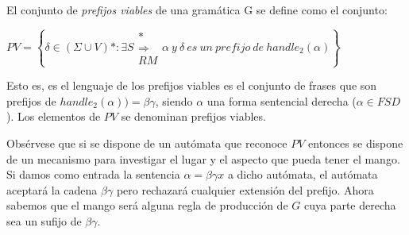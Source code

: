 \begin{definition}
El conjunto de \emph{prefijos viables} de una gramática G se define
como  el conjunto:

\begin{center}
$PV = \left \{ \delta \in (\Sigma \cup V)* :  \exists S \begin{array}{c} *\\ \Longrightarrow \\ {\scriptstyle RM} \end{array} \alpha\  y\ \delta\ es\ un\ prefijo\ de\  handle_2(\alpha) \right \}$ 
\end{center}
\end{definition}

Esto es, es el lenguaje de los prefijos viables es el 
conjunto de frases que son prefijos de 
$handle_2(\alpha)) =  \beta \gamma$, 
siendo $\alpha$ una forma sentencial derecha ($\alpha \in FSD$). Los
elementos de $PV$ se denominan prefijos viables.

Obsérvese que si se dispone de un autómata que reconoce 
$PV$ entonces se dispone de un mecanismo para investigar el lugar y 
el aspecto que pueda tener el mango. Si damos como 
entrada la sentencia $\alpha = \beta \gamma x$
a dicho autómata, el autómata aceptará la cadena $\beta \gamma$ pero rechazará
cualquier extensión del prefijo. Ahora sabemos que el mango 
será alguna regla de producción de $G$ cuya parte derecha 
sea un sufijo de  $\beta \gamma$.

